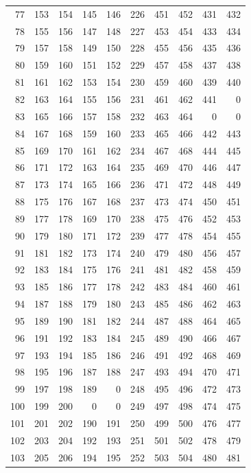 \begin{longtable}{rrrrr@{\qquad}rrrrr}
77 & 153 & 154 & 145 & 146 & 226 & 451 & 452 & 431 & 432 \\
78 & 155 & 156 & 147 & 148 & 227 & 453 & 454 & 433 & 434 \\
79 & 157 & 158 & 149 & 150 & 228 & 455 & 456 & 435 & 436 \\
80 & 159 & 160 & 151 & 152 & 229 & 457 & 458 & 437 & 438 \\
81 & 161 & 162 & 153 & 154 & 230 & 459 & 460 & 439 & 440 \\
82 & 163 & 164 & 155 & 156 & 231 & 461 & 462 & 441 & 0 \\
83 & 165 & 166 & 157 & 158 & 232 & 463 & 464 & 0 & 0 \\
84 & 167 & 168 & 159 & 160 & 233 & 465 & 466 & 442 & 443 \\
85 & 169 & 170 & 161 & 162 & 234 & 467 & 468 & 444 & 445 \\
86 & 171 & 172 & 163 & 164 & 235 & 469 & 470 & 446 & 447 \\
87 & 173 & 174 & 165 & 166 & 236 & 471 & 472 & 448 & 449 \\
88 & 175 & 176 & 167 & 168 & 237 & 473 & 474 & 450 & 451 \\
89 & 177 & 178 & 169 & 170 & 238 & 475 & 476 & 452 & 453 \\
90 & 179 & 180 & 171 & 172 & 239 & 477 & 478 & 454 & 455 \\
91 & 181 & 182 & 173 & 174 & 240 & 479 & 480 & 456 & 457 \\
92 & 183 & 184 & 175 & 176 & 241 & 481 & 482 & 458 & 459 \\
93 & 185 & 186 & 177 & 178 & 242 & 483 & 484 & 460 & 461 \\
94 & 187 & 188 & 179 & 180 & 243 & 485 & 486 & 462 & 463 \\
95 & 189 & 190 & 181 & 182 & 244 & 487 & 488 & 464 & 465 \\
96 & 191 & 192 & 183 & 184 & 245 & 489 & 490 & 466 & 467 \\
97 & 193 & 194 & 185 & 186 & 246 & 491 & 492 & 468 & 469 \\
98 & 195 & 196 & 187 & 188 & 247 & 493 & 494 & 470 & 471 \\
99 & 197 & 198 & 189 & 0 & 248 & 495 & 496 & 472 & 473 \\
100 & 199 & 200 & 0 & 0 & 249 & 497 & 498 & 474 & 475 \\
101 & 201 & 202 & 190 & 191 & 250 & 499 & 500 & 476 & 477 \\
102 & 203 & 204 & 192 & 193 & 251 & 501 & 502 & 478 & 479 \\
103 & 205 & 206 & 194 & 195 & 252 & 503 & 504 & 480 & 481 \\

\end{longtable}
